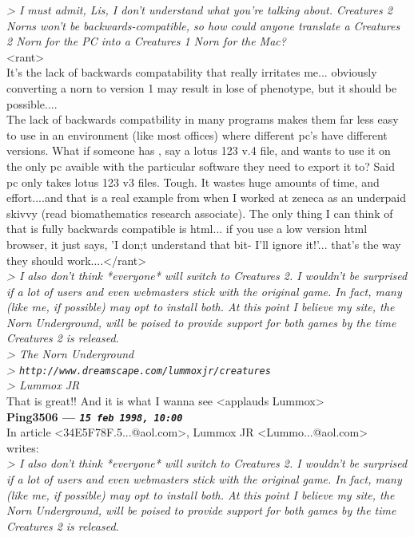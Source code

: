 \documentclass[11pt,twoside,a4paper]{article}
\begin{document}
\begin{multicols*}{2}
\emph{> I must admit, Lis, I don't understand what you're talking about. Creatures 2 Norns won't be backwards-compatible, so how could anyone translate a Creatures 2 Norn for the PC into a Creatures 1 Norn for the Mac?}~\\

<rant>~\\
It's the lack of backwards compatability that really irritates me... obviously converting a norn to version 1 may result in lose of phenotype, but it should be possible....~\\
The lack of backwards compatbility in many programs makes them far less easy to use in an environment (like most offices) where different pc's have different versions. What if someone has , say a lotus 123 v.4 file, and wants to use it on the only pc avaible with the particular software they need to export it to? Said pc only takes lotus 123 v3 files. Tough. It wastes huge amounts of time, and effort....and that is a real example from when I worked at zeneca as an underpaid skivvy (read biomathematics research associate). The only thing I can think of that is fully backwards compatible is html... if you use a low version html browser, it just says, 'I don;t understand that bit- I'll ignore it!'... that's the way they should work....</rant>~\\

\emph{> I also don't think *everyone* will switch to Creatures 2. I wouldn't be surprised if a lot of users and even webmasters stick with the original game. In fact, many (like me, if possible) may opt to install both. At this point I believe my site, the Norn Underground, will be poised to provide support for both games by the time Creatures 2 is released.}~\\

\emph{> The Norn Underground}~\\
\emph{> \texttt{http://www.dreamscape.com/lummoxjr/creatures}}~\\
\emph{> Lummox JR}~\\

That is great!! And it is what I wanna see <applauds Lummox>~\\

 
		
	
		
\textbf{Ping3506 --- \emph{\texttt{15 feb 1998, 10:00}}}~\\

In article <34E5F78F.5...@aol.com>, Lummox JR <Lummo...@aol.com> writes:~\\
\emph{> I also don't think *everyone* will switch to Creatures 2. I wouldn't be surprised if a lot of users and even webmasters stick with the original game. In fact, many (like me, if possible) may opt to install both. At this point I believe my site, the Norn Underground, will be poised to provide support for both games by the time Creatures 2 is released.}~\\


\end{multicols*}
\end{document}
